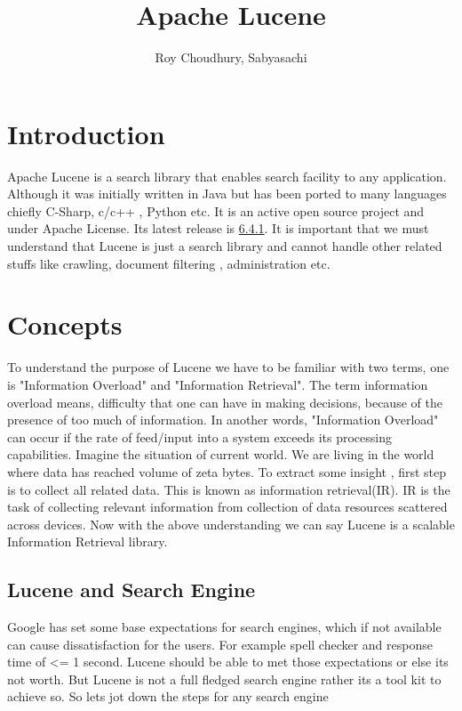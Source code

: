 \documentclass[9pt,twocolumn,twoside]{styles/osajnl}
\title{Apache Lucene}
\author[1,*, +]{Roy Choudhury, Sabyasachi}
\affil[1]{School of Informatics and Computing, Bloomington, IN 47408, U.S.A.}
\affil[*]{Corresponding authors: sabyroyc@indiana.edu}
\affil[+]{HID - S17-IO-3015}
\begin{document}
\maketitle

\section{Introduction}

Apache Lucene is a search library that enables search facility to any application. Although it was initially written in Java but has been ported to many languages chiefly C-Sharp, c/c++ , Python etc. It is an active open source project and under Apache License. Its latest release is \href{http://lucene.apache.org/core/6_4_1/index.html}{6.4.1}. It is important that we must understand that Lucene is just a search library and cannot handle other related stuffs like crawling, document filtering , administration etc.

\section{Concepts}
To understand the purpose of Lucene we have to be familiar with two terms, one is "Information Overload" and "Information Retrieval"\cite{wiki-ir}. The term information overload means, difficulty that one can have in making decisions, because of the presence of too much of information. In another words, "Information Overload" can occur if the rate of feed/input into a system exceeds its processing capabilities. Imagine the situation of current world. We are living in the world where data has reached volume of zeta bytes. To extract some insight , first step is to collect all related data. This is known as information retrieval(IR). IR is the task of collecting relevant information from collection of data resources scattered across devices. Now with the above understanding we can say Lucene is a scalable Information Retrieval library.

\subsection{Lucene and Search Engine}
Google has set some base expectations for search engines, which if not available can cause dissatisfaction for the users. For example spell checker and response time of <= 1 second. Lucene should be able to met those expectations or else its not worth. But Lucene is not a full fledged search engine rather its a tool kit to achieve so. So lets jot down the steps for any search engine 
\end{document}
